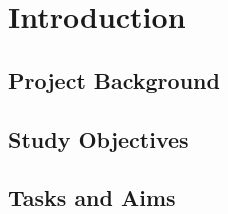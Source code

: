 
\chapter{Introduction}\label{chp:introduction}

\section{Project Background}\label{sec:background}

\section{Study Objectives}\label{sec:objectives}

\section{Tasks and Aims}\label{sec:aims}
